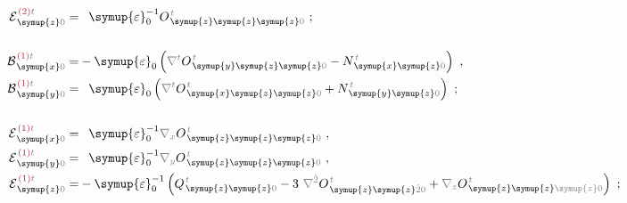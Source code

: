 \begin{subequations} \label{eq:EB^(2-0)_0=}
\begin{align}
	{\mathcal{E}}^{\;\!\textcolor{Maroon}{(2)}\mathcolor{gray}{t}}_{\;\! \symup{z} \mathcolor{gray}{0}} = &\hphantom{+} {\symup{\varepsilon}}_0^{-1} O^{\;\!\mathcolor{gray}{t}}_{\;\! \symup{z}\symup{z}\symup{z}\mathcolor{gray}{0}}~; \label{eq:E^(2)_z0=} \\[1.5em]
	{\mathcal{B}}^{\;\!\textcolor{Maroon}{(1)}\mathcolor{gray}{t}}_{\;\! \symup{x} \mathcolor{gray}{0}} = &- {\symup{\varepsilon}}_0 \left( \mathcolor{gray}{\nabla^t}
	O^{\;\!\mathcolor{gray}{t}}_{\;\!\symup{y}\symup{z}\symup{z}\mathcolor{gray}{0}} - N^{\;\!\mathcolor{gray}{t}}_{\;\!\symup{x}\symup{z}\mathcolor{gray}{0}} \right)~, \label{eq:B^(1)_x0=} \\
	{\mathcal{B}}^{\;\!\textcolor{Maroon}{(1)}\mathcolor{gray}{t}}_{\;\! \symup{y} \mathcolor{gray}{0}} = &\hphantom{+} {\symup{\varepsilon}}_0 \left( \mathcolor{gray}{\nabla^t}
	O^{\;\!\mathcolor{gray}{t}}_{\;\!\symup{x}\symup{z}\symup{z}\mathcolor{gray}{0}} + N^{\;\!\mathcolor{gray}{t}}_{\;\!\symup{y}\symup{z}\mathcolor{gray}{0}} \right)~; \label{eq:B^(1)_y0=} \\[1.5em]
	{\mathcal{E}}^{\;\!\textcolor{Maroon}{(1)}\mathcolor{gray}{t}}_{\;\! \symup{x} \mathcolor{gray}{0}} = &\hphantom{+} {\symup{\varepsilon}}_0^{-1} \mathcolor{gray}{\nabla_x} O^{\;\!\mathcolor{gray}{t}}_{\;\! \symup{z}\symup{z}\symup{z}\mathcolor{gray}{0}}~, \label{eq:E^(1)_x0=} \\
	{\mathcal{E}}^{\;\!\textcolor{Maroon}{(1)}\mathcolor{gray}{t}}_{\;\! \symup{y} \mathcolor{gray}{0}} = &\hphantom{+} {\symup{\varepsilon}}_0^{-1} \mathcolor{gray}{\nabla_y} O^{\;\!\mathcolor{gray}{t}}_{\;\! \symup{z}\symup{z}\symup{z}\mathcolor{gray}{0}}~, \label{eq:E^(1)_y0=} \\
	{\mathcal{E}}^{\;\!\textcolor{Maroon}{(1)}\mathcolor{gray}{t}}_{\;\! \symup{z} \mathcolor{gray}{0}} = &- {\symup{\varepsilon}}_0^{-1} \left( Q^{\;\!\mathcolor{gray}{t}}_{\;\! \symup{z} \symup{z} \mathcolor{gray}{0}} - 3~ \mathcolor{gray}{\nabla^{\hat{2}}} O^{\;\!\mathcolor{gray}{t}}_{\;\! \symup{z} \symup{z} \mathcolor{gray}{\hat{2}} \mathcolor{gray}{0}} + \mathcolor{gray}{\nabla_z} O^{\;\!\mathcolor{gray}{t}}_{\;\! \symup{z} \symup{z} \mathcolor{gray}{\symup{z}} \mathcolor{gray}{0}} \right)~; \label{eq:E^(1)_z0=} \\[1.5em]

\end{align}
\end{subequations}
